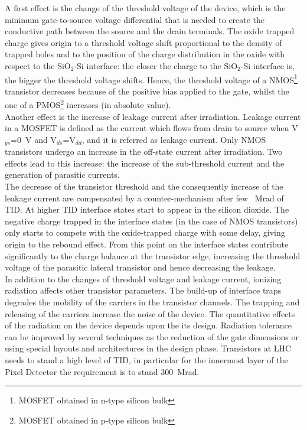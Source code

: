 A first effect is the change of the threshold voltage of the device, which is the minimum gate-to-source voltage differential that is needed to create the conductive path between the source and the drain terminals. The oxide trapped charge gives origin to a threshold voltage shift proportional to the density of trapped holes and to the position of the charge distribution in the oxide with respect to the SiO$_2$-Si interface: the closer the charge to the 
SiO$_2$-Si interface is, the bigger the threshold voltage shifts. Hence, the threshold voltage of a NMOS\footnote{MOSFET obtained in n-type silicon bulk} transistor decreases because of the positive bias applied to the gate, whilst the one of a PMOS\footnote{MOSFET obtained in p-type silicon bulk} increases (in absolute value).\\
Another effect is the increase of leakage current after irradiation. Leakage current in a MOSFET is defined as the current which flows from drain to source when V$_{gs}$=\SI{0}{\volt} and V$_{ds}$=V$_{dd}$, and it is referred as
leakage current. Only NMOS transistors undergo an increase in the off-state current after irradiation. Two effects lead to this increase: the increase of the sub-threshold current and the generation of parasitic currents.\\
The decrease of the transistor threshold and the consequently increase of the leakage current are compensated by a counter-mechanism after few \SI{}{\mega\radian} of TID. At higher TID interface states start to appear in the silicon dioxide. The negative charge trapped in the interface states (in the case of NMOS transistors) only starts to compete with the oxide-trapped charge with some delay, giving origin to the rebound effect. From this point on the interface states contribute significantly to the charge balance at the transistor edge, increasing the threshold voltage of the parasitic lateral transistor and hence decreasing the leakage.\\
In addition to the changes of threshold voltage and leakage current, ionizing radiation affects other transistor parameters. The build-up of interface traps degrades the mobility of the carriers in the transistor channels. The trapping and releasing of the carriers increase the noise of the device.
The quantitative effects of the radiation on the device depends upon the its design. Radiation tolerance can be improved by several techniques as the reduction of the gate dimensions or using special layouts and architectures in the design phase. Transistors at LHC needs to stand a high level of TID, in particular for the innermost layer of the Pixel Detector the requirement is to stand \SI{300}{\mega\radian}.\\
